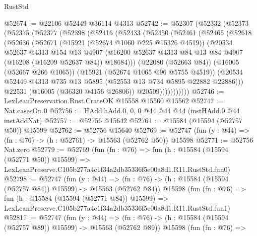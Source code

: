 \begin{lexlean}{RustStd}
\begin{coremodule}
@52674 := @22106 @52449 @36114 @4313
@52742 := @52307
    (@52332
      (@52373
        (@52375
          (@52377
            (@52398
              (@52416
                (@52433
                  (@52450
                    (@52461
                      (@52465
                        (@52618
                          (@52636
                            (@52671
                              (@15921 (@52674 @1060 @225 @15326 @4519))
                              (@20534
                                @52637
                                @4313
                                @154
                                @13
                                @4907
                                (@16200
                                  @52637
                                  @4313
                                  @84
                                  @13
                                  @84
                                  @4907
                                  (@16208 (@16209 @52637 @84))
                                  @18684)))
                            (@22080 (@52663 @84))
                            (@16005 (@52667 @266 @1065))
                            (@15921 (@52674 @1065 @96 @5755 @4519))
                            (@20534
                              @52449
                              @4313
                              @735
                              @13
                              @5895
                              (@52553 @13 @734 @5895 @22882 @22886)))
                          @22531
                          (@16005 (@36320 @4156 @26806))
                          @20509)))))))))))
@52746 := LexLeanPreservation.Rust.CrateOK @15558 @15560 @15562
@52747 := Nat.casesOn.{0}
@52756 := HAdd.hAdd.{0, 0, 0} @44 @44 @44 (instHAdd.{0} @44 instAddNat)
@52757 := @52756 @15642
@52761 := @15584 (@15594 (@52757 @50)) @15599
@52762 := @52756 @15640
@52769 := @52747 (fun (y : @44) => (fn : @76) -> (h : @52761) -> @15563 (@52762 @50)) @15598
@52771 := @52756 Nat.zero
@52779 := @52769
    (fun (fn : @76) =>
    fun (h : @15584 (@15594 (@52771 @50)) @15599) =>
    LexLeanPreserve.C105b277a4c1f34a2db35336f5e00a8d1.R11.RustStd.fun0)
@52798 := @52747
    (fun (y : @44) =>
    (fn : @76) -> (h : @15584 (@15594 (@52757 @84)) @15599) -> @15563 (@52762 @84))
    @15598
    (fun (fn : @76) =>
    fun (h : @15584 (@15594 (@52771 @84)) @15599) =>
    LexLeanPreserve.C105b277a4c1f34a2db35336f5e00a8d1.R11.RustStd.fun1)
@52817 := @52747
    (fun (y : @44) =>
    (fn : @76) -> (h : @15584 (@15594 (@52757 @89)) @15599) -> @15563 (@52762 @89))
    @15598
    (fun (fn : @76) =>

\end{coremodule}
\end{lexlean}
